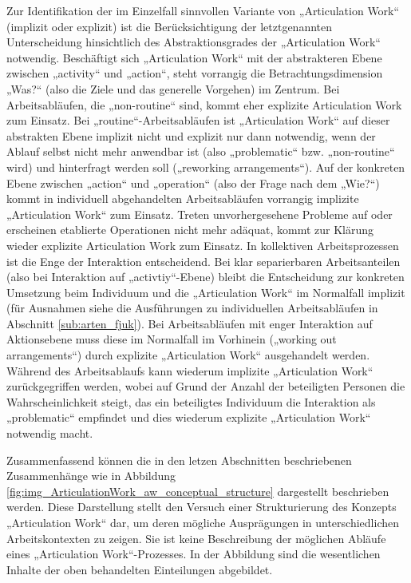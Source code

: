 Zur Identifikation der im Einzelfall sinnvollen Variante von „Articulation Work“ (implizit oder explizit) ist die Berücksichtigung der letztgenannten Unterscheidung hinsichtlich des Abstraktionsgrades der „Articulation Work“ notwendig. Beschäftigt sich „Articulation Work“ mit der abstrakteren Ebene zwischen „activity“ und „action“, steht vorrangig die Betrachtungsdimension „Was?“ (also die Ziele und das generelle Vorgehen) im Zentrum. Bei Arbeitsabläufen, die „non-routine“ sind, kommt eher explizite Articulation Work zum Einsatz. Bei „routine“-Arbeitsabläufen ist „Articulation Work“ auf dieser abstrakten Ebene implizit nicht und explizit nur dann notwendig, wenn der Ablauf selbst nicht mehr anwendbar ist (also „problematic“ bzw. „non-routine“ wird) und hinterfragt werden soll („reworking arrangements“). Auf der konkreten Ebene zwischen „action“ und „operation“ (also der Frage nach dem „Wie?“) kommt in individuell abgehandelten Arbeitsabläufen vorrangig implizite „Articulation Work“ zum Einsatz. Treten unvorhergesehene Probleme auf oder erscheinen etablierte Operationen nicht mehr adäquat, kommt zur Klärung wieder explizite Articulation Work zum Einsatz. In kollektiven Arbeitsprozessen ist die Enge der Interaktion entscheidend. Bei klar separierbaren Arbeitsanteilen (also bei Interaktion auf „activtiy“-Ebene) bleibt die Entscheidung zur konkreten Umsetzung beim Individuum und die „Articulation Work“ im Normalfall implizit (für Ausnahmen siehe die Ausführungen zu individuellen Arbeitsabläufen in Abschnitt \ref{sub:arten_fjuk}). Bei Arbeitsabläufen mit enger Interaktion auf Aktionsebene muss diese im Normalfall im Vorhinein („working out arrangements“) durch explizite „Articulation Work“ ausgehandelt werden. Während des Arbeitsablaufs kann wiederum implizite „Articulation Work“ zurückgegriffen werden, wobei auf Grund der Anzahl der beteiligten Personen die Wahrscheinlichkeit steigt, das ein beteiligtes Individuum die Interaktion als „problematic“ empfindet und dies wiederum explizite „Articulation Work“ notwendig macht.

Zusammenfassend können die in den letzen Abschnitten beschriebenen Zusammenhänge wie in Abbildung \ref{fig:img_ArticulationWork_aw_conceptual_structure} dargestellt beschrieben werden. Diese Darstellung stellt den Versuch einer Strukturierung des Konzepts „Articulation Work“ dar, um deren mögliche Ausprägungen in unterschiedlichen Arbeitskontexten zu zeigen. Sie ist keine Beschreibung der möglichen Abläufe eines „Articulation Work“-Prozesses. In der Abbildung sind die wesentlichen Inhalte der oben behandelten Einteilungen abgebildet.

